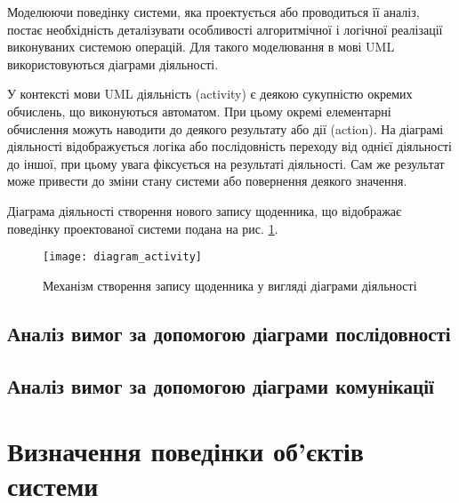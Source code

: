\documentclass[../main.tex]{subfiles}
\begin{document}
Моделюючи поведінку системи, яка проектується або проводиться її аналіз, постає необхідність деталізувати особливості алгоритмічної і логічної реалізації виконуваних системою операцій. Для такого моделювання в мові UML використовуються діаграми діяльності.

У контексті мови UML діяльність (activity) є деякою сукупністю окремих обчислень, що виконуються автоматом. При цьому окремі елементарні обчислення можуть наводити до деякого результату або дії (action). На діаграмі діяльності відображується логіка або послідовність переходу від однієї діяльності до іншої, при цьому увага фіксується на результаті діяльності. Сам же результат може привести до зміни стану системи або повернення деякого значення.

Діаграма діяльності створення нового запису щоденника, що відображає поведінку проектованої системи подана на рис. \ref{diagram:2}.

\begin{figure}[H]
	\centering
	\texttt{[image: diagram\_activity]}
	\caption{Механізм створення запису щоденника у вигляді діаграми діяльності}
	\label{diagram:2}
\end{figure}


\subsection{Аналіз вимог за допомогою діаграми послідовності}

\subsection{Аналіз вимог за допомогою діаграми комунікації}

\section{Визначення поведінки об'єктів системи}
\end{document}
